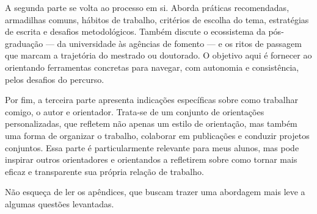 A segunda parte se volta ao processo em si. Aborda práticas recomendadas, armadilhas comuns, hábitos de trabalho, critérios de escolha do tema, estratégias de escrita e desafios metodológicos. Também discute o ecossistema da pós-graduação — da universidade às agências de fomento — e os ritos de passagem que marcam a trajetória do mestrado ou doutorado. O objetivo aqui é fornecer ao orientando ferramentas concretas para navegar, com autonomia e consistência, pelos desafios do percurso.

Por fim, a terceira parte apresenta indicações específicas sobre como trabalhar comigo, o autor e orientador. Trata-se de um conjunto de orientações personalizadas, que refletem não apenas um estilo de orientação, mas também uma forma de organizar o trabalho, colaborar em publicações e conduzir projetos conjuntos. Essa parte é particularmente relevante para meus alunos, mas pode inspirar outros orientadores e orientandos a refletirem sobre como tornar mais eficaz e transparente sua própria relação de trabalho.

Não esqueça de ler os apêndices, que buscam trazer uma abordagem mais leve a algumas questões levantadas.

